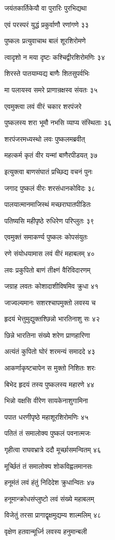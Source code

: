 जयंतकार्तिकेयौ वा पुरारिः पुरभिद्यथा

एवं परस्परं युद्धं प्रकुर्वाणौ रणांगणे ३३

पुष्कलः प्रत्युवाचाथ बालं शूरशिरोमणे

त्वादृशो न मया दृष्टः कश्चिद्वीरशिरोमणिः ३४

शिरस्ते पातयाम्यद्य बाणैः शितसुपर्वभिः

मा पलायस्व समरे प्राणान्रक्षस्व संयतः ३५

एवमुक्त्वा लवं वीरं चकार शरपंजरे

पुष्कलस्य शरा भूमौ नभसि व्याप्य संस्थिताः ३६

शरपंजरमध्यस्थो लवः पुष्कलमब्रवीत्

महत्कर्म कृतं वीर यन्मां बाणैरपीडयत् ३७

इत्युक्त्वा बाणसंघातं प्रच्छिद्य वचनं पुनः

जगाद पुष्कलं वीरः शरसंधानकोविदः ३८

पालयात्मानमाजिस्थं मच्छराघातपीडितः

पतिष्यसि महीपृष्ठे रुधिरेण परिप्लुतः ३९

एवमुक्तं समाकर्ण्य पुष्कलः कोपसंयुतः

रणे संयोधयामास लवं वीरं महाबलम् ४०

लवः प्रकुपितो बाणं तीक्ष्णं वैरिविदारणम्

जग्राह लवतः कोशादाशीविषमिव क्रुधा ४१

जाज्वल्यमानः सशरश्चापमुक्तो लवस्य च

हृदयं भेत्तुमुद्युक्तश्छिन्नो भारतिनाशु सः ४२

छिन्ने भारतिना संख्ये शरेण प्राणहारिणा

अत्यंतं कुपितो घोरं शरमन्यं समाददे ४३

आकर्णाकृष्टचापेन स मुक्तो निशितः शरः

बिभेद हृदयं तस्य पुष्कलस्य महारणे ४४

भिन्नो वक्षसि वीरेण सायकेनाशुगामिना

पपात धरणीपृष्ठे महाशूरशिरोमणिः ४५

पतितं तं समालोक्य पुष्कलं पवनात्मजः

गृहीत्वा राघवभ्रात्रे ददौ मूर्च्छासमन्वितम् ४६

मूर्च्छितं तं समालोक्य शोकविह्वलमानसः

हनूमंतं लवं हंतुं निदिदेश क्रुधान्वितः ४७

हनूमान्क्रोधसंप्लुष्टो लवं संख्ये महाबलम्

विजेतुं तरसा प्रागाद्वृक्षमुद्यम्य शाल्मलिम् ४८

वृक्षेण हतवान्मूर्ध्नि लवस्य हनुमान्बली

